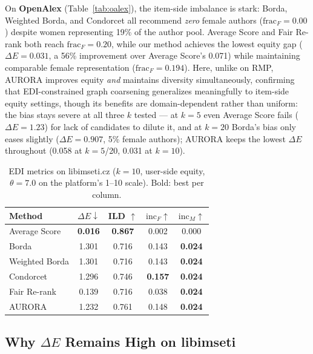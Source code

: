 \documentclass[runningheads]{llncs}
\begin{document}
On \textbf{OpenAlex} (Table~\ref{tab:oalex}), the item-side imbalance is
stark: Borda, Weighted Borda, and Condorcet all recommend \emph{zero} female
authors ($\mathrm{frac}_F = 0.00$) despite women representing 19\% of the
author pool. Average Score and Fair Re-rank both reach $\mathrm{frac}_F = 0.20$,
while our method achieves the lowest equity gap ($\Delta E = 0.031$, a 56\%
improvement over Average Score's 0.071) while maintaining comparable female
representation ($\mathrm{frac}_F = 0.194$). Here, unlike on RMP, AURORA
improves equity \emph{and} maintains diversity simultaneously, confirming
that EDI-constrained graph coarsening generalizes meaningfully to item-side
equity settings, though its benefits are domain-dependent rather than
uniform: the bias stays severe at all three $k$ tested — at $k=5$ even
Average Score fails ($\Delta E=1.23$) for lack of candidates to dilute
it, and at $k=20$ Borda's bias only eases slightly ($\Delta E=0.907$,
5\% female authors); AURORA keeps the lowest $\Delta E$ throughout
(0.058 at $k=5$/20, 0.031 at $k=10$).

\begin{table}[h!]
\caption{EDI metrics on libimseti.cz ($k=10$, user-side equity, $\theta=7.0$
on the platform's 1--10 scale). Bold: best per column.}
\label{tab:libimseti}
\centering
\begin{tabular}{lcccc}
\hline
Method & $\Delta E \downarrow$ & ILD $\uparrow$ &
$\mathrm{inc}_F \uparrow$ & $\mathrm{inc}_M \uparrow$ \\
\hline
Average Score  & \textbf{0.016} & \textbf{0.867} & 0.002 & 0.000 \\
Borda          & 1.301 & 0.716 & 0.143 & \textbf{0.024} \\
Weighted Borda & 1.301 & 0.716 & 0.143 & \textbf{0.024} \\
Condorcet      & 1.296 & 0.746 & \textbf{0.157} & \textbf{0.024} \\
Fair Re-rank   & 0.139 & 0.716 & 0.038 & \textbf{0.024} \\
AURORA           & 1.232 & 0.761 & 0.148 & \textbf{0.024} \\
\hline
\end{tabular}
\end{table}

\subsection{Why $\Delta E$ Remains High on libimseti}
\label{sec:libimseti-limitation}
\end{document}

